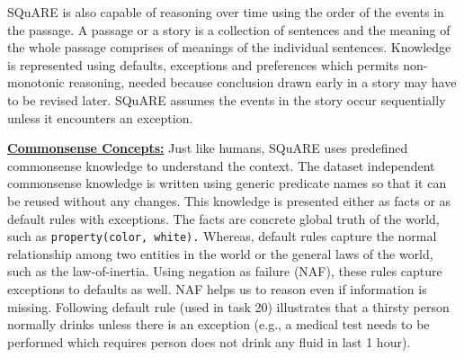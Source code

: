 \documentclass[letterpaper]{article}
\begin{document}
SQuARE is also capable of reasoning over time using the order of the events in the passage. A passage or a story is a collection of sentences and the meaning of the whole passage comprises of meanings of the individual sentences. Knowledge is represented using defaults, exceptions and preferences which permits non-monotonic reasoning, needed because conclusion drawn early in a story may have to be revised later. SQuARE assumes the events in the story occur sequentially unless it encounters an exception. 

\medskip 
\noindent\textbf{\underline{Commonsense Concepts:}}
Just like humans, SQuARE uses predefined commonsense knowledge to understand the context. The dataset independent commonsense knowledge is written using generic predicate names so that it can be reused without any changes. This knowledge is presented either as facts or as default rules with exceptions. The facts are concrete global truth of the world, such as \texttt{property(color, white).} Whereas, default rules capture the normal relationship among two entities in the world or the general laws of the world, such as the law-of-inertia. Using negation as failure (NAF), these rules capture exceptions to defaults as well. NAF helps us to reason even if information is missing. Following default rule (used in task 20) illustrates that a thirsty person normally drinks unless there is an exception (e.g., a medical test needs to be performed which requires person does not drink any fluid in last 1 hour).

\smallskip 
\noindent    
\cprotect {}
    
\end{document}
